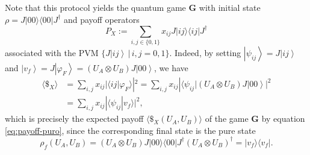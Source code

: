 \documentclass[11pt,a4paper,twoside]{article}
\newcommand{\ket}[1]{\left| #1 \right\rangle} %
\begin{document}
Note that this protocol yields the quantum game $\mathbf{G}$ with initial state $\rho=J|00\rangle\langle 00|J^\dagger$ and payoff operators 
\begin{equation}
    \label{PX-EWL}
P_X:=\sum_{i,j\in\{0,1\}}x_{ij}J|ij\rangle\langle ij|J^\dagger
\end{equation}
associated with the PVM $\{J\ket{ij}\,|\,i,j=0,1\}$. Indeed, by setting $\ket{\psi_{ij}}=J\ket{ij}$ and $\ket{v_f}=J\ket{\varphi_F}=(U_A\otimes U_B)J\ket{00}$, we have
\begin{align*}\langle\$_{X}\rangle&=\sum_{i,j} x_{ij}|\langle ij|\varphi_F\rangle|^2=\sum_{i,j} x_{ij}|\langle\psi_{ij}|(U_A\otimes U_B)J\ket{00}|^2\\
&=\sum_{i,j} x_{ij}|\langle\psi_{ij}|v_f\rangle|^2,
\end{align*}
which is precisely the expected payoff $\langle\$_{X}(U_A,U_B)\rangle$ of the game $\mathbf{G}$ by equation \eqref{eq:payoff-puro}, since the corresponding final state is the pure state
$$\rho_f(U_A, U_B)=(U_A\otimes U_B)J|00\rangle\langle 00|J^\dagger(U_A\otimes U_B)^\dagger=|v_f\rangle\langle v_f|.$$
\end{document}
